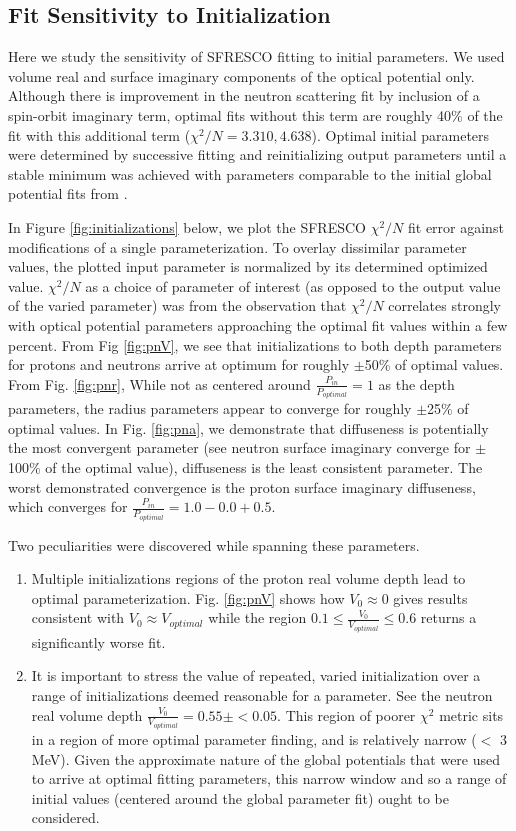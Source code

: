\subsection{Fit Sensitivity to Initialization}
Here we study the sensitivity of SFRESCO fitting to initial parameters. We used volume real and surface imaginary components of the optical potential only. Although there is improvement in the neutron scattering fit by inclusion of a spin-orbit imaginary term, optimal fits without this term are roughly 40\% of the fit with this additional term ($\chi^2/N = 3.310, 4.638 $). Optimal initial parameters were determined by successive fitting and reinitializing output parameters until a stable minimum was achieved with parameters comparable to the initial global potential fits from \cite{capote2009ripl}.
\par
In Figure \ref{fig:initializations} below, we plot the SFRESCO $\chi^2/N$ fit error against modifications of a single parameterization. To overlay dissimilar parameter values, the plotted input parameter is normalized by its determined optimized value. $\chi^2/N$ as a choice of parameter of interest (as opposed to the output value of the varied parameter) was from the observation that  $\chi^2/N$ correlates strongly with optical potential parameters approaching the optimal fit values within a few percent. From Fig \ref{fig:pnV}, we see that initializations to both depth parameters for protons and neutrons arrive at optimum for roughly $\pm$50\% of optimal values. From Fig. \ref{fig:pnr}, While not as centered around $\frac{P_{in}}{P_{optimal}}=1$ as the depth parameters, the radius parameters appear to converge for roughly $\pm$25\% of optimal values. In Fig. \ref{fig:pna}, we demonstrate that diffuseness is potentially the most convergent parameter (see neutron surface imaginary converge for $\pm$100\% of the optimal value), diffuseness is the least consistent parameter. The worst demonstrated convergence is the proton surface imaginary diffuseness, which converges for $\frac{P_{in}}{P_{optimal}}=1.0-0.0+0.5$.
\par
Two peculiarities were discovered while spanning these parameters.
\begin{enumerate}
\item Multiple initializations regions of the proton real volume depth lead to optimal parameterization. Fig. \ref{fig:pnV} shows how $V_0\approx 0$ gives results consistent with $V_0 \approx V_{optimal}$ while the region $0.1 \leq \frac{V_0}{V_{optimal}} \leq 0.6$ returns a significantly worse fit.
\item It is important to stress the value of repeated, varied initialization over a range of initializations deemed reasonable for a parameter. See the neutron real volume depth $\frac{V_0}{V_{optimal}} = 0.55 \pm <0.05$. This region of poorer $\chi^2$ metric sits in a region of more optimal parameter finding, and is relatively narrow ($<$ 3 MeV). Given the approximate nature of the global potentials that were used to arrive at optimal fitting parameters, this narrow window and so a range of initial values (centered around the global parameter fit) ought to be considered. 
\end{enumerate}
